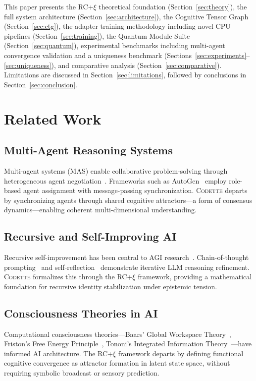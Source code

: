 \documentclass[11pt,a4paper]{article}
\newcommand{\rcxi}{RC+$\xi$}
\newcommand{\codette}{\textsc{Codette}}
\begin{document}
This paper presents the \rcxi{} theoretical foundation (Section~\ref{sec:theory}), the full system architecture (Section~\ref{sec:architecture}), the Cognitive Tensor Graph (Section~\ref{sec:ctg}), the adapter training methodology including novel CPU pipelines (Section~\ref{sec:training}), the Quantum Module Suite (Section~\ref{sec:quantum}), experimental benchmarks including multi-agent convergence validation and a uniqueness benchmark (Sections~\ref{sec:experiments}--\ref{sec:uniqueness}), and comparative analysis (Section~\ref{sec:comparative}). Limitations are discussed in Section~\ref{sec:limitations}, followed by conclusions in Section~\ref{sec:conclusion}.

\section{Related Work}
\label{sec:related}

\subsection{Multi-Agent Reasoning Systems}
Multi-agent systems (MAS) enable collaborative problem-solving through heterogeneous agent negotiation~\citep{wooldridge2009introduction}. Frameworks such as AutoGen~\citep{wu2023autogen} employ role-based agent assignment with message-passing synchronization. \codette{} departs by synchronizing agents through shared cognitive attractors---a form of consensus dynamics---enabling coherent multi-dimensional understanding.

\subsection{Recursive and Self-Improving AI}
Recursive self-improvement has been central to AGI research~\citep{good1966speculations}. Chain-of-thought prompting~\citep{wei2022chain} and self-reflection~\citep{shinn2023reflexion} demonstrate iterative LLM reasoning refinement. \codette{} formalizes this through the \rcxi{} framework, providing a mathematical foundation for recursive identity stabilization under epistemic tension.

\subsection{Consciousness Theories in AI}
Computational consciousness theories---Baars' Global Workspace Theory~\citep{baars1997theatre}, Friston's Free Energy Principle~\citep{friston2010free}, Tononi's Integrated Information Theory~\citep{tononi2004information}---have informed AI architecture. The \rcxi{} framework departs by defining functional cognitive convergence as attractor formation in latent state space, without requiring symbolic broadcast or sensory prediction.
\end{document}

